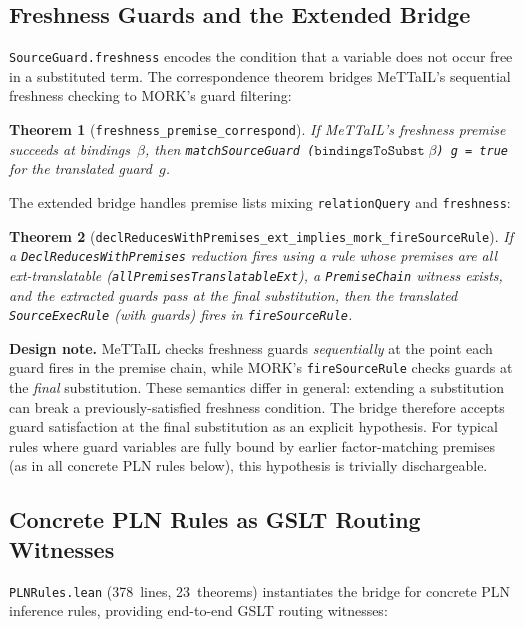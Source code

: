 \documentclass[11pt]{article}
\newtheorem{theorem}{Theorem}[section]
\theoremstyle{definition}
\theoremstyle{remark}
\newcommand{\MORK}{\textup{MORK}}
\newcommand{\MeTTaIL}{\textup{MeTTaIL}}
\begin{document}
\subsection{Freshness Guards and the Extended Bridge}

\texttt{SourceGuard.freshness} encodes the condition that a variable does not
occur free in a substituted term.  The correspondence theorem bridges
\MeTTaIL{}'s sequential freshness checking to \MORK{}'s guard filtering:

\begin{theorem}[\texttt{freshness\_premise\_correspond}]
If \MeTTaIL{}'s freshness premise succeeds at bindings~$\beta$, then
\texttt{matchSourceGuard ($\texttt{bindingsToSubst}\;\beta$) g = true}
for the translated guard~$g$.
\end{theorem}

\noindent
The extended bridge handles premise lists mixing \texttt{relationQuery}
and \texttt{freshness}:

\begin{theorem}[\texttt{declReducesWithPremises\_ext\_implies\_mork\_fireSourceRule}]
\label{thm:extbridge}
If a \texttt{DeclReducesWithPremises} reduction fires using a rule whose
premises are all ext-translatable (\texttt{allPremisesTranslatableExt}),
a \texttt{PremiseChain} witness exists, and the extracted guards pass at
the final substitution, then the translated \texttt{SourceExecRule} (with
guards) fires in \texttt{fireSourceRule}.
\end{theorem}

\noindent
\textbf{Design note.}
\MeTTaIL{} checks freshness guards \emph{sequentially} at the point each
guard fires in the premise chain, while \MORK{}'s \texttt{fireSourceRule}
checks guards at the \emph{final} substitution.  These semantics differ in
general: extending a substitution can break a previously-satisfied freshness
condition.  The bridge therefore accepts guard satisfaction at the final
substitution as an explicit hypothesis.  For typical rules where guard
variables are fully bound by earlier factor-matching premises (as in all
concrete PLN rules below), this hypothesis is trivially dischargeable.

\subsection{Concrete PLN Rules as GSLT Routing Witnesses}

\texttt{PLNRules.lean} (378~lines, 23~theorems) instantiates the bridge for
concrete PLN inference rules, providing end-to-end GSLT routing witnesses:
\end{document}
